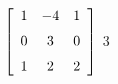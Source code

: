 {$\left[ \begin {array}{ccc} 1&-4&1\\\noalign{\medskip}0&3&0
\\\noalign{\medskip}1&2&2\end {array} \right] $} 
{$3$}

  

 

